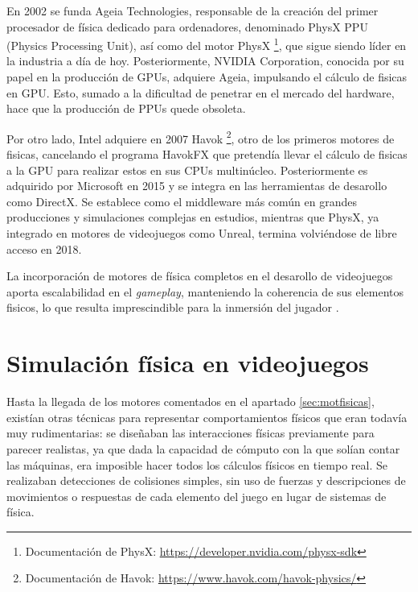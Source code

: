 En 2002 se funda Ageia Technologies, responsable de la creación del primer procesador de física dedicado para ordenadores, denominado PhysX PPU (Physics Processing Unit), así como del motor PhysX \footnote{Documentación de PhysX: \url{https://developer.nvidia.com/physx-sdk}}, que sigue siendo líder en la industria a día de hoy. Posteriormente, NVIDIA Corporation, conocida por su papel en la producción de GPUs, adquiere Ageia, impulsando el cálculo de fisicas en GPU. Esto, sumado a la dificultad de penetrar en el mercado del hardware, hace que la producción de PPUs quede obsoleta. \newline %

Por otro lado, Intel adquiere en 2007 Havok \footnote{Documentación de Havok: \url{https://www.havok.com/havok-physics/}}, otro de los primeros motores de fisicas, cancelando el programa HavokFX que pretendía llevar el cálculo de fisicas a la GPU para realizar estos en sus CPUs multinúcleo. Posteriormente es adquirido por Microsoft en 2015 y se integra en las herramientas de desarollo como DirectX. Se establece como el middleware más común en grandes producciones y simulaciones complejas en estudios, mientras que PhysX, ya integrado en motores de videojuegos como Unreal, termina volviéndose de libre acceso en 2018.\newline

La incorporación de motores de física completos en el desarollo de videojuegos aporta escalabilidad en el \textit{gameplay}, manteniendo la coherencia de sus elementos fisicos, lo que resulta imprescindible para la inmersión del jugador \cite{hecker2000physics}.  \newline

\section{Simulación física en videojuegos}
Hasta la llegada de los motores comentados en el apartado \ref{sec:motfisicas}, existían otras técnicas para representar comportamientos físicos que eran todavía muy rudimentarias: se diseñaban las interacciones físicas previamente para parecer realistas, ya que dada la capacidad de cómputo con la que solían contar las máquinas, era imposible hacer todos los cálculos físicos en tiempo real. Se realizaban detecciones de colisiones simples, sin uso de fuerzas y descripciones de movimientos o respuestas de cada elemento del juego en lugar de sistemas de física. \newline

